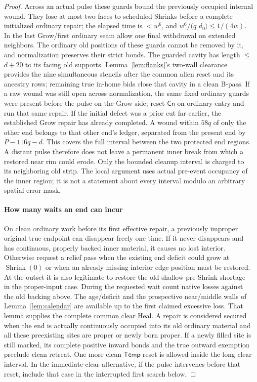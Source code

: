 \begin{proof}
Across an actual pulse these guards bound the previously occupied internal wound. They lose at most two faces to scheduled Shrinks before a complete initialized ordinary repair; the elapsed time is \(<w^6\), and \(w^6/(q\) \(d_0)\le 1/(4w)\). In the last Grow/first ordinary seam allow one final withdrawal on extended neighbors. The ordinary old positions of these guards cannot be removed by it, and normalization preserves their strict bonds. The guarded cavity has length \(\le\)\(d+20\) to its facing old supports. Lemma~\ref{lem:flanks}'s two-wall clearance provides the nine simultaneous stencils after the common alien reset and its ancestry rows; remaining true in-home bids close that cavity in a clean B-pass. If a raw wound was still open across normalization, the same fixed ordinary guards were present before the pulse on the Grow side; reset \(\mathsf{Cn}\) on ordinary entry and run that same repair. If the initial defect was a prior cut far earlier, the established Grow repair has already completed. A wound within \(58q\) of only the other end belongs to that other end's ledger, separated from the present end by \(P- 116q- d\). This covers the full interval between the two protected end regions. A distant pulse therefore does not leave a permanent inner break from which a restored near rim could erode. Only the bounded cleanup interval is charged to its neighboring old strip. The local argument uses actual pre-event occupancy of the inner region; it is not a statement about every interval modulo an arbitrary spatial error mask.

\paragraph{How many waits an end can incur}

On clean ordinary work before its first effective repair, a previously improper original true endpoint can disappear freely one time. If it never disappears and has continuous, properly backed inner material, it causes no lost interior. Otherwise request a relief pass when the existing end deficit could grow at \(\operatorname{Shrink}(0)\) or when an already missing interior edge position must be restored. At the outset it is also legitimate to restore the old shallow pre-Shrink shortage in the proper-input case. During the requested wait count native losses against the old backing above. The age/deficit and the prospective near/middle walls of Lemma~\ref{lem:calendar} are available up to the first claimed excessive loss. That lemma supplies the complete common clear Heal. A repair is considered secured when the end is actually continuously occupied into its old ordinary material and all these preexisting sites are proper or newly born proper. If a newly filled site is still marked, its complete positive inward bonds and the true outward exemption preclude clean retreat. One more clean \(\mathsf{Temp}\) reset is allowed inside the long clear interval. In the immediate-clear alternative, if the pulse intervenes before that reset, include that case in the interrupted first search below.


\end{proof}
